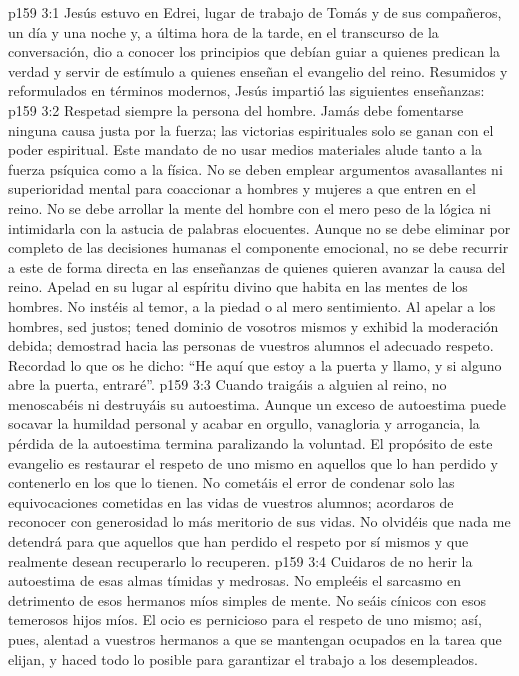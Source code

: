 \vs p159 3:1 Jesús estuvo en Edrei, lugar de trabajo de Tomás y de sus compañeros, un día y una noche y, a última hora de la tarde, en el transcurso de la conversación, dio a conocer los principios que debían guiar a quienes predican la verdad y servir de estímulo a quienes enseñan el evangelio del reino. Resumidos y reformulados en términos modernos, Jesús impartió las siguientes enseñanzas:
\vs p159 3:2 \pc Respetad siempre la persona del hombre. Jamás debe fomentarse ninguna causa justa por la fuerza; las victorias espirituales solo se ganan con el poder espiritual. Este mandato de no usar medios materiales alude tanto a la fuerza psíquica como a la física. No se deben emplear argumentos avasallantes ni superioridad mental para coaccionar a hombres y mujeres a que entren en el reino. No se debe arrollar la mente del hombre con el mero peso de la lógica ni intimidarla con la astucia de palabras elocuentes. Aunque no se debe eliminar por completo de las decisiones humanas el componente emocional, no se debe recurrir a este de forma directa en las enseñanzas de quienes quieren avanzar la causa del reino. Apelad en su lugar al espíritu divino que habita en las mentes de los hombres. No instéis al temor, a la piedad o al mero sentimiento. Al apelar a los hombres, sed justos; tened dominio de vosotros mismos y exhibid la moderación debida; demostrad hacia las personas de vuestros alumnos el adecuado respeto. Recordad lo que os he dicho: “He aquí que estoy a la puerta y llamo, y si alguno abre la puerta, entraré”.
\vs p159 3:3 Cuando traigáis a alguien al reino, no menoscabéis ni destruyáis su autoestima. Aunque un exceso de autoestima puede socavar la humildad personal y acabar en orgullo, vanagloria y arrogancia, la pérdida de la autoestima termina paralizando la voluntad. El propósito de este evangelio es restaurar el respeto de uno mismo en aquellos que lo han perdido y contenerlo en los que lo tienen. No cometáis el error de condenar solo las equivocaciones cometidas en las vidas de vuestros alumnos; acordaros de reconocer con generosidad lo más meritorio de sus vidas. No olvidéis que nada me detendrá para que aquellos que han perdido el respeto por sí mismos y que realmente desean recuperarlo lo recuperen.
\vs p159 3:4 Cuidaros de no herir la autoestima de esas almas tímidas y medrosas. No empleéis el sarcasmo en detrimento de esos hermanos míos simples de mente. No seáis cínicos con esos temerosos hijos míos. El ocio es pernicioso para el respeto de uno mismo; así, pues, alentad a vuestros hermanos a que se mantengan ocupados en la tarea que elijan, y haced todo lo posible para garantizar el trabajo a los desempleados.
